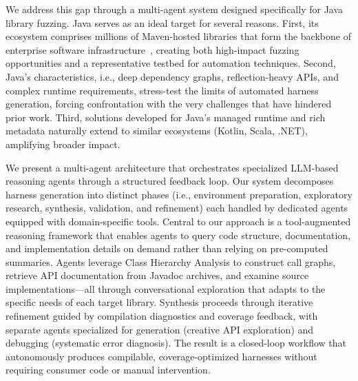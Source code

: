 \documentclass[sigconf,review,anonymous]{acmart}
\begin{document}
We address this gap through a multi-agent system designed specifically for Java library fuzzing. Java serves as an ideal target for several reasons. First, its ecosystem comprises millions of Maven-hosted libraries that form the backbone of enterprise software infrastructure~\cite{CITE}, creating both high-impact fuzzing opportunities and a representative testbed for automation techniques. Second, Java's characteristics, i.e., deep dependency graphs, reflection-heavy APIs, and complex runtime requirements, stress-test the limits of automated harness generation, forcing confrontation with the very challenges that have hindered prior work. Third, solutions developed for Java's managed runtime and rich metadata naturally extend to similar ecosystems (Kotlin, Scala, .NET), amplifying broader impact.

We present a multi-agent architecture that orchestrates specialized LLM-based reasoning agents through a structured feedback loop. Our system decomposes harness generation into distinct phases (i.e., environment preparation, exploratory research, synthesis, validation, and refinement) each handled by dedicated agents equipped with domain-specific tools. Central to our approach is a tool-augmented reasoning framework that enables agents to query code structure, documentation, and implementation details on demand rather than relying on pre-computed summaries. Agents leverage Class Hierarchy Analysis to construct call graphs, retrieve API documentation from Javadoc archives, and examine source implementations—all through conversational exploration that adapts to the specific needs of each target library. Synthesis proceeds through iterative refinement guided by compilation diagnostics and coverage feedback, with separate agents specialized for generation (creative API exploration) and debugging (systematic error diagnosis). The result is a closed-loop workflow that autonomously produces compilable, coverage-optimized harnesses without requiring consumer code or manual intervention.
\end{document}
